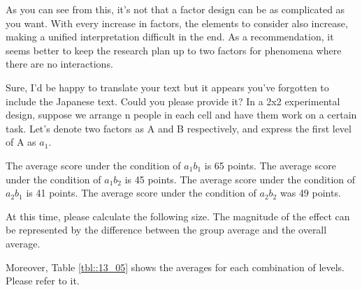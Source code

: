 \documentclass{ltjbook}
\begin{document}
As you can see from this, it's not that a factor design can be as complicated as you want. With every increase in factors, the elements to consider also increase, making a unified interpretation difficult in the end. As a recommendation, it seems better to keep the research plan up to two factors for phenomena where there are no interactions.

Sure, I'd be happy to translate your text but it appears you've forgotten to include the Japanese text. Could you please provide it?
In a 2x2 experimental design, suppose we arrange n people in each cell and have them work on a certain task. Let's denote two factors as A and B respectively, and express the first level of A as $a_1$.

The average score under the condition of $a_1b_1$ is 65 points.
The average score under the condition of $a_1b_2$ is 45 points.
The average score under the condition of $a_2b_1$ is 41 points.
The average score under the condition of $a_2b_2$ was 49 points.


At this time, please calculate the following size. The magnitude of the effect can be represented by the difference between the group average and the overall average.


Moreover, Table \ref{tbl::13_05} shows the averages for each combination of levels. Please refer to it.


\end{document}
